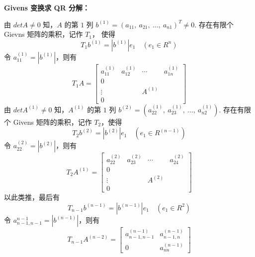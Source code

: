             \par \textbf{Givens 变换求 QR 分解：}
            \par 由 $det A \ne 0$ 知，$A$ 的第 $1$ 列 $b^{(1)} = (a_{11}, \ a_{21}, \ \dots, \ a_{n1})^T \ne 0$. 存在有限个 Gievns 矩阵的乘积，记作 $T_1$， 使得
            \begin{equation*}
                T_1b^{(1)} = |b^{(1)}|e_1 \quad (e_1 \in R^n)
            \end{equation*}
            令 $a_{11}^{(1)} = |b^{(1)}|$，则有
            \begin{equation*}
                T_1A = \begin{bmatrix}
                    a_{11}^{(1)} &  a_{12}^{(1)} & \cdots &  a_{1n}^{(1)} \\ 0 & & & \\ \vdots & & A^{(1)} & \\ 0 & & & 
                \end{bmatrix}
            \end{equation*}
            由 $detA^{(1)} \ne 0$ 知，$A^{(1)}$ 的第 $1$ 列 $b^{(2)} = (a_{22}^{(1)}, \ a_{23}^{(1)}, \ \dots, \ a_{n2}^{(1)})$. 存在有限个 Givens 矩阵的乘积，记作 $T_2$，使得
            \begin{equation*}
                T_2b^{(2)} = |b^{(2)}|e_1 \quad (e_1 \in R^{(n-1)})
            \end{equation*}
            令 $a_{22}^{(2)} = |b^{(2)}|$，则有
            \begin{equation*}
                T_2A^{(1)} = \begin{bmatrix}
                    a_{22}^{(2)} &  a_{23}^{(2)} & \cdots &  a_{24}^{(2)} \\ 0 & & & \\ \vdots & & A^{(2)} & \\ 0 & & & 
                \end{bmatrix}
            \end{equation*} 
            以此类推，最后有 
            \begin{equation*}
                T_{n-1}b^{(n-1)} = |b^{(n-1)}|e_1 \quad (e_1 \in R^2)
            \end{equation*}
            令 $a_{n-1,n-1}^{n-1} = |b^{(n-1)}|$，则有
            \begin{equation*}
                T_{n-1}A^{(n-2)} = \begin{bmatrix}
                    a_{n-1,n-1}^{(n-1)} & a_{n-1,n}^{(n-1)} \\ 0 & a_{nn}^{(n-1)}
                \end{bmatrix}
            \end{equation*}
